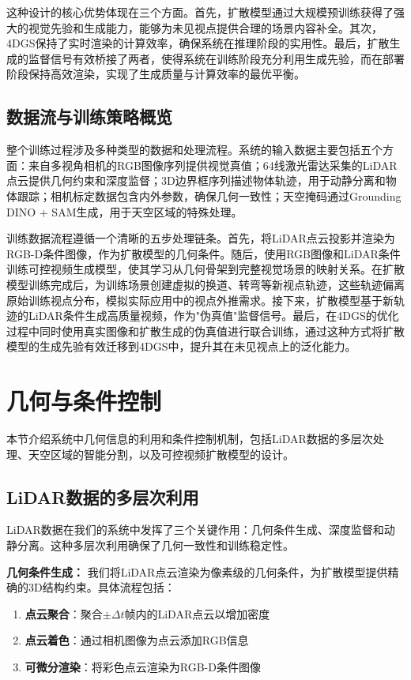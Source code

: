 这种设计的核心优势体现在三个方面。首先，扩散模型通过大规模预训练获得了强大的视觉先验和生成能力，能够为未见视点提供合理的场景内容补全。其次，4DGS保持了实时渲染的计算效率，确保系统在推理阶段的实用性。最后，扩散生成的监督信号有效桥接了两者，使得系统在训练阶段充分利用生成先验，而在部署阶段保持高效渲染，实现了生成质量与计算效率的最优平衡。

\subsection{数据流与训练策略概览}

整个训练过程涉及多种类型的数据和处理流程。系统的输入数据主要包括五个方面：来自多视角相机的RGB图像序列提供视觉真值；64线激光雷达采集的LiDAR点云提供几何约束和深度监督；3D边界框序列描述物体轨迹，用于动静分离和物体跟踪；相机标定数据包含内外参数，确保几何一致性；天空掩码通过Grounding DINO + SAM生成，用于天空区域的特殊处理。

训练数据流程遵循一个清晰的五步处理链条。首先，将LiDAR点云投影并渲染为RGB-D条件图像，作为扩散模型的几何条件。随后，使用RGB图像和LiDAR条件训练可控视频生成模型，使其学习从几何骨架到完整视觉场景的映射关系。在扩散模型训练完成后，为训练场景创建虚拟的换道、转弯等新视点轨迹，这些轨迹偏离原始训练视点分布，模拟实际应用中的视点外推需求。接下来，扩散模型基于新轨迹的LiDAR条件生成高质量视频，作为"伪真值"监督信号。最后，在4DGS的优化过程中同时使用真实图像和扩散生成的伪真值进行联合训练，通过这种方式将扩散模型的生成先验有效迁移到4DGS中，提升其在未见视点上的泛化能力。

\section{几何与条件控制}

本节介绍系统中几何信息的利用和条件控制机制，包括LiDAR数据的多层次处理、天空区域的智能分割，以及可控视频扩散模型的设计。

\subsection{LiDAR数据的多层次利用}

LiDAR数据在我们的系统中发挥了三个关键作用：几何条件生成、深度监督和动静分离。这种多层次利用确保了几何一致性和训练稳定性。

\textbf{几何条件生成：}
我们将LiDAR点云渲染为像素级的几何条件，为扩散模型提供精确的3D结构约束。具体流程包括：

\begin{enumerate}
\item \textbf{点云聚合}：聚合$\pm\Delta t$帧内的LiDAR点云以增加密度
\item \textbf{点云着色}：通过相机图像为点云添加RGB信息
\item \textbf{可微分渲染}：将彩色点云渲染为RGB-D条件图像
\end{enumerate}

